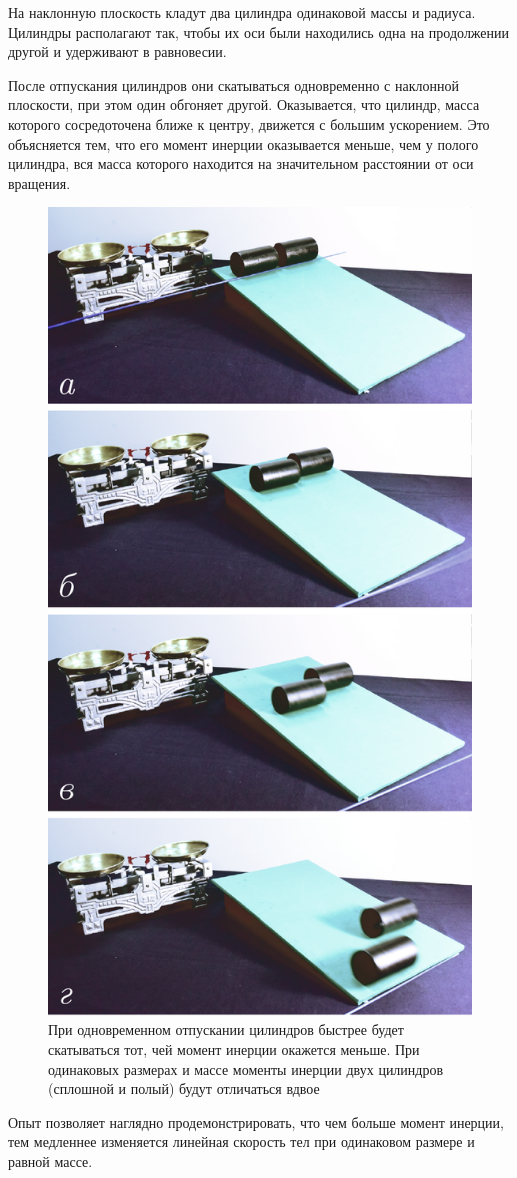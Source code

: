 \documentclass[14pt,a4paper,oneside]{extarticle}	%
\begin{document}
	На наклонную плоскость кладут два цилиндра одинаковой массы и радиуса.
	Цилиндры располагают так, чтобы их оси были находились одна на продолжении другой и удерживают в равновесии.
	
	После отпускания цилиндров они скатываться одновременно с наклонной плоскости, при этом один обгоняет другой. Оказывается, что цилиндр, масса которого сосредоточена ближе к центру, движется с большим ускорением. Это объясняется тем, что его момент инерции оказывается меньше, чем у полого цилиндра, вся масса которого находится на значительном расстоянии от оси вращения.
	
	\begin{figure}[H] 	
		\centering 	
		\includegraphics[width=0.6\linewidth]{inclinedplane-2.png}
		\caption{При одновременном отпускании цилиндров быстрее будет скатываться тот, чей момент инерции окажется меньше. При одинаковых размерах и массе моменты инерции двух цилиндров (сплошной и полый) будут отличаться вдвое}
		\label{inclinedplane-2}
	\end{figure}

	Опыт позволяет наглядно продемонстрировать, что чем больше момент инерции, тем медленнее изменяется линейная скорость тел при одинаковом размере и равной массе.
	
\end{document}
